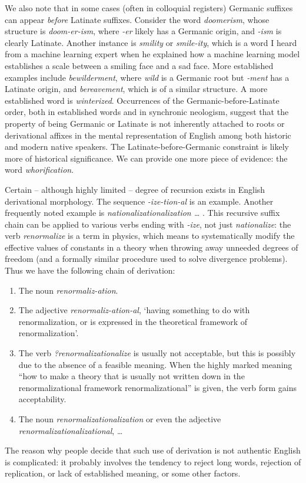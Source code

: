 \documentclass[UTF8, a4paper, oneside, scheme=plain, 12pt]{ctexbook}
\newcommand*{\citepage}[1]{p.~{#1}}
\newcommand{\form}[1]{\emph{#1}}
\newcommand{\translate}[1]{`#1'}
\begin{document}
We also note that in some cases (often in colloquial registers)
Germanic suffixes can appear \emph{before} Latinate suffixes.
Consider the word \form{doomerism}, whose structure is \form{doom-er-ism},
where \form{-er} likely has a Germanic origin,
and \form{-ism} is clearly Latinate.
Another instance is \form{smility} or \form{smile-ity}, which is a word I heard from a machine learning expert
when he explained how a machine learning model establishes a scale between a smiling face and a sad face.
More established examples include \form{bewilderment},
where \form{wild} is a Germanic root but \form{-ment} has a Latinate origin,
and \form{bereavement}, which is of a similar structure.
A more established word is \form{winterized}.
Occurrences of the Germanic-before-Latinate order,
both in established words and in synchronic neologism,
suggest that the property of being Germanic or Latinate is not
inherently attached to roots or derivational affixes
in the mental representation of English among both historic and modern native speakers.
The Latinate-before-Germanic constraint is likely more of historical significance.
We can provide one more piece of evidence: the word \form{whorification}.

Certain -- although highly limited -- degree of recursion exists in English derivational morphology.
The sequence \form{-ize-tion-al} is an example.
Another frequently noted example is \form{nationalizationalization \dots}
\citep[\citepage{xvii}]{roeper2014recursion}.
This recursive suffix chain can be applied to various verbs 
ending with \form{-ize},
not just \form{nationalize}:
the verb \form{renormalize} is a term in physics,
which means to systematically modify the effective values of constants in a theory 
when throwing away unneeded degrees of freedom 
(and a formally similar procedure used to solve divergence problems).
Thus we have the following chain of derivation:
\begin{enumerate}
    \item The noun \form{renormaliz-ation}.
    \item The adjective \form{renormaliz-ation-al},
    \translate{having something to do with renormalization,
    or is expressed in the theoretical framework of renormalization}.
    \item The verb \form{?renormalizationalize}
    is usually not acceptable,
    but this is possibly due to the absence of a feasible meaning.
    When the highly marked meaning
    ``how to make a theory that is usually not written down in the renormalizational framework
    renormalizational'' is given, 
    the verb form gains acceptability.
    \item The noun \form{renormalizationalization} 
    or even the adjective \form{renormalizationalizational}, \dots
\end{enumerate}
The reason why people decide that such use of derivation is not authentic English is complicated:
it probably involves the tendency to reject long words, 
rejection of replication,
or lack of established meaning,
or some other factors.
\end{document}
